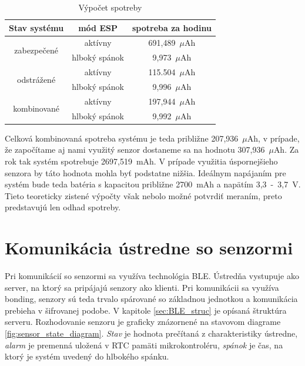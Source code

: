 \begin{table}[ht]
    \centering
    \renewcommand{\arraystretch}{1.5}
    \begin{tabular}{|c|c|c|} \hline
        Stav systému                    & mód ESP          & spotreba za hodinu \\ \hline
        \multirow{2}{*}{zabezpečené}    & aktívny          & 691,489~$\mu$Ah \\ \cline{2-3}
                                        & hlboký spánok    & 9,973~$\mu$Ah \\ \hline
        \multirow{2}{*}{odstrážené}     & aktívny          & 115.504~$\mu$Ah \\ \cline{2-3}
                                        & hlboký spánok    & 9,996~$\mu$Ah \\ \hline
        \multirow{2}{*}{kombinované}    & aktívny          & 197,944~$\mu$Ah \\ \cline{2-3}
                                        & hlboký spánok    & 9,992~$\mu$Ah \\ \hline
    \end{tabular}
    \caption{Výpočet spotreby}
    \label{tab:spotreba_jednotky}
\end{table}

Celková kombinovaná spotreba systému je teda približne 207,936~$\mu$Ah, v prípade, že započítame aj nami využitý senzor dostaneme sa na hodnotu 307,936~$\mu$Ah. Za rok tak systém spotrebuje 2697,519~mAh. V prípade využitia úspornejšieho senzora by táto hodnota mohla byť podstatne nižšia. Ideálnym napájaním pre systém bude teda batéria s kapacitou približne 2700~mAh a napätím 3,3~-~3,7~V. Tieto teoreticky zistené výpočty však nebolo možné potvrdiť meraním, preto predstavujú len odhad spotreby.

\section{Komunikácia ústredne so senzormi}\label{sec:komunikacia}

Pri komunikácií so senzormi sa využíva technológia BLE. Ústredňa vystupuje ako server, na ktorý sa pripájajú senzory ako klienti. Pri komunikácii sa využíva bonding, senzory sú teda trvalo spárované so základnou jednotkou a komunikácia prebieha v šifrovanej podobe. V kapitole \ref{sec:BLE_struc} je opísaná štruktúra serveru. Rozhodovanie senzoru je graficky znázornené na stavovom diagrame \ref{fig:sensor_state_diagram}. \textit{Stav} je hodnota prečítaná z charakteristiky ústredne, \textit{alarm} je premenná uložená v RTC pamäti mikrokontroléru, \textit{spánok} je čas, na ktorý je systém uvedený do hlbokého spánku.

